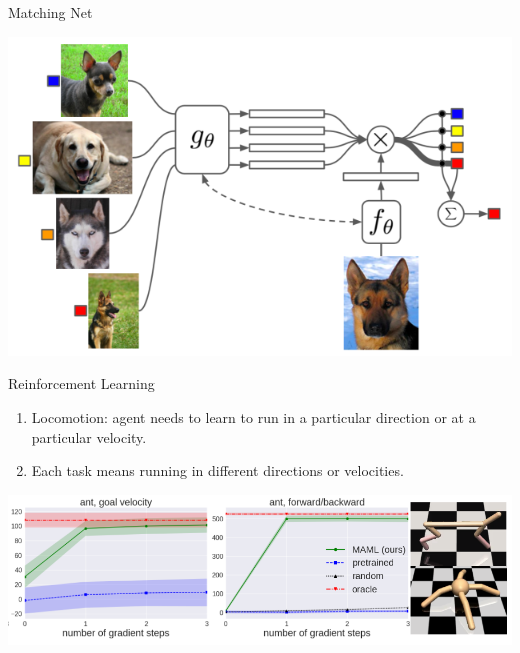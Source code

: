 \documentclass[compress]{beamer}
\begin{document}
\begin{frame}[t]{Matching Net}
    \begin{center}
        \includegraphics[height=.7\textheight]{matchingnet}
    \end{center}
\end{frame}

\begin{frame}[t]{Reinforcement Learning}
    \begin{enumerate}
        \item Locomotion: agent needs to learn to run in a particular direction or at a particular velocity.
        \item Each task means running in different directions or velocities.
    \end{enumerate}
    \begin{center}
        \includegraphics[height=.4\textheight,width=\textwidth]{reinforceexp}
    \end{center}

\end{frame}



% 
% 
\end{document}
